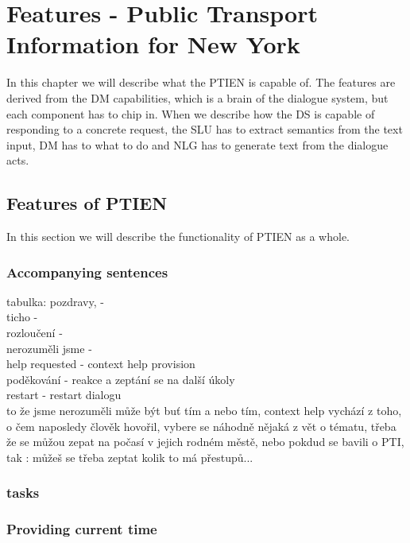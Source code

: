 \chapter{Features - Public Transport Information for New York}

In this chapter we will describe what the PTIEN is capable of. The features are derived from the DM capabilities, which is a brain of the dialogue system, but each component has to chip in. When we describe how the DS is capable of responding to a concrete request, the SLU has to extract semantics from the text input, DM has to what to do and NLG has to generate text from the dialogue acts.


\section{Features of PTIEN}

In this section we will describe the functionality of PTIEN as a whole.

\subsection{Accompanying sentences}

tabulka:
pozdravy, -  \\
ticho -  \\
rozloučení -  \\
nerozuměli jsme -  \\
help requested - context help provision \\
poděkování - reakce a zeptání se na další úkoly \\
restart - restart dialogu \\

to že jsme nerozuměli může být buť tím a nebo tím,
context help vychází z toho, o čem naposledy člověk hovořil, vybere se náhodně nějaká z vět o tématu, třeba že se můžou zepat na počasí v jejich rodném městě, nebo pokdud se bavili o PTI, tak : můžeš se třeba zeptat kolik to má přestupů...




\subsection{tasks}

\subsection{Providing current time} \label{subsec:time}

